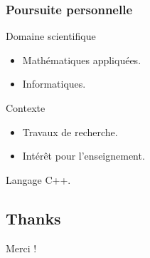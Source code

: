 \begin{frame}
\frametitle{Poursuite personnelle}
  \begin{block}{Domaine scientifique}
    \begin{itemize}
			\item Mathématiques appliquées.
			\item Informatiques.
		\end{itemize}	
  \end{block} 
  
    \begin{block}{Contexte}
    \begin{itemize}
      \item Travaux de recherche.
			\item Intérêt pour l'enseignement.
		\end{itemize}	
  \end{block} 
  
  \begin{exampleblock}{}
    Langage C++.
  \end{exampleblock} 
\end{frame}

\subsection{Thanks}
\begin{frame}
  \begin{block}{}
    \begin{center}
      Merci !
    \end{center}

  \end{block}
\end{frame}
